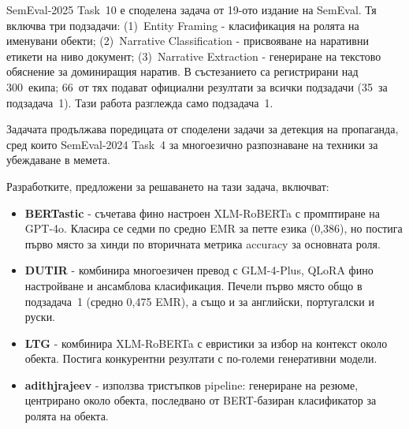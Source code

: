 \documentclass[12pt,a4paper]{report}
\begin{document}
SemEval-2025 Task~10 \cite{piskorski2025semeval} е споделена задача от 19-ото издание на SemEval. Тя включва три подзадачи: (1)~Entity Framing - класификация на ролята на именувани обекти; (2)~Narrative Classification - присвояване на наративни етикети на ниво документ; (3)~Narrative Extraction - генериране на текстово обяснение за доминиращия наратив. В състезанието са регистрирани над 300~екипа; 66~от тях подават официални резултати за всички подзадачи (35~за подзадача~1). Тази работа разглежда само подзадача~1.

Задачата продължава поредицата от споделени задачи за детекция на пропаганда, сред които SemEval-2024 Task~4 \cite{dimitrov2024semeval} за многоезично разпознаване на техники за убеждаване в мемета.

Разработките, предложени за решаването на тази задача, включват:

\begin{itemize}
  \item \textbf{BERTastic} \cite{mahmoud2025bertastic} - съчетава фино настроен XLM-RoBERTa с промптиране на GPT-4o. Класира се седми по средно EMR за петте езика (0,386), но постига първо място за хинди по вторичната метрика accuracy за основната роля.
  \item \textbf{DUTIR} \cite{lv2025dutir} - комбинира многоезичен превод с GLM-4-Plus, QLoRA фино настройване и ансамблова класификация. Печели първо място общо в подзадача~1 (средно 0,475 EMR), а също и за английски, португалски и руски.
  \item \textbf{LTG} \cite{ronningstad2025ltg} - комбинира XLM-RoBERTa с евристики за избор на контекст около обекта. Постига конкурентни резултати с по-големи генеративни модели.
  \item \textbf{adithjrajeev} \cite{rajeev2025adithjrajeev} - използва тристъпков pipeline: генериране на резюме, центрирано около обекта, последвано от BERT-базиран класификатор за ролята на обекта.
\end{itemize}
\end{document}
